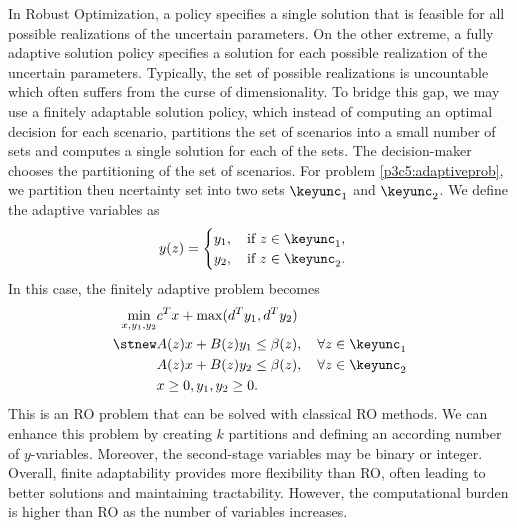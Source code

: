 In Robust Optimization, a policy specifies a single solution that is feasible for all possible realizations of the uncertain parameters. On the other extreme, a fully adaptive solution policy specifies a solution for each possible realization of the uncertain parameters. Typically, the set of possible realizations is uncountable which often suffers from the curse of dimensionality. To bridge this gap, we may use a finitely adaptable solution policy, which instead of computing an optimal decision for each scenario, partitions the set of scenarios into a small number of sets and computes a single solution for each of the sets. The decision-maker chooses the partitioning of the set of scenarios. For problem \ref{p3c5:adaptiveprob}, we partition theu ncertainty set into two sets $\keyunc_1$ and $\keyunc_2$. We define the adaptive variables as 
\begin{align*}
y(z) = \begin{cases} y_1,\quad \text{if }z\in\keyunc_1, \\ y_2,\quad \text{if }z\in\keyunc_2.\end{cases}
\end{align*} 
In this case, the finitely adaptive problem becomes
\begin{align}\label{p3c5:finadaptiveprob}
\min\limits_{x,y_1,y_2} & c^T x + \max ( d^Ty_1,d^Ty_2) \\
\stnew & A(z)x+ B(z)y_1 \leq \beta(z),\quad\forall z\in\keyunc_1 \\
& A(z)x+ B(z)y_2 \leq \beta(z),\quad\forall z\in\keyunc_2 \\
& x\geq 0, y_1,y_2\geq 0.
\end{align}
This is an RO problem that can be solved with classical RO methods. We can enhance this problem by creating $k$ partitions and defining an according number of $y$-variables. Moreover, the second-stage variables may be binary or integer. Overall, finite adaptability provides more flexibility than RO, often leading to better solutions and maintaining tractability. However, the computational burden is higher than RO as the number of variables increases.
